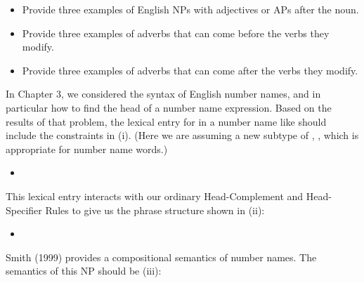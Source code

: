 \documentclass[a4paper,landscape,headrule,footrule]{foils}
\begin{document}
\begin{itemize}
\item[F.] Provide three examples of English NPs with
adjectives or APs after the noun.
\item[G.] Provide three examples of adverbs that can come before
the verbs they modify.
\item[H.] Provide three examples of adverbs that can come after
the verbs they modify.
\end{itemize}


In  Chapter 3, we considered the
syntax of English number names, and in particular how
to find the head of a number name expression. Based on the
results of that problem, the lexical entry for
 in a number name like 
should include the constraints in (i). (Here we are assuming
a new subtype of , , which is appropriate
for number name words.)

\begin{itemize}
\item[(i)] 
\end{itemize}

This lexical entry interacts with our ordinary Head-Complement
and Head-Specifier Rules to give us the phrase structure shown in
(ii):

\begin{itemize}
\item[(ii)] 
\end{itemize}

Smith (1999) provides a compositional semantics
of number names. The semantics of this NP should be (iii):
\end{document}
